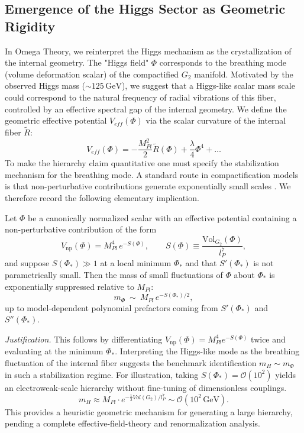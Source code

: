 \subsection{Emergence of the Higgs Sector as Geometric Rigidity}
In Omega Theory, we reinterpret the Higgs mechanism as the crystallization of the internal geometry. The "Higgs field" $\Phi$ corresponds to the breathing mode (volume deformation scalar) of the compactified $G_2$ manifold.
Motivated by the observed Higgs mass ($\sim 125\,\mathrm{GeV}$), we suggest that a Higgs-like scalar mass scale could correspond to the natural frequency of radial vibrations of this fiber, controlled by an effective spectral gap of the internal geometry.
We define the geometric effective potential $V_{eff}(\Phi)$ via the scalar curvature of the internal fiber $\tilde{R}$:
\begin{equation}
    V_{eff}(\Phi) = - \frac{M_{Pl}^2}{2} \tilde{R}(\Phi) + \frac{\lambda}{4} \Phi^4 + \dots
\end{equation}
\noindent
To make the hierarchy claim quantitative one must specify the stabilization mechanism for the breathing mode. A standard route in compactification models is that non-perturbative contributions generate exponentially small scales \cite{KKLT2003}. We therefore record the following elementary implication.
\begin{proposition}
\label{prop:higgs_hierarchy}
Let $\Phi$ be a canonically normalized scalar with an effective potential containing a non-perturbative contribution of the form
\begin{equation}
    V_{\mathrm{np}}(\Phi)=M_{Pl}^4\,e^{-S(\Phi)},\qquad S(\Phi)\equiv \frac{\mathrm{Vol}_{G_2}(\Phi)}{l_P^7},
\end{equation}
and suppose $S(\Phi_\ast)\gg 1$ at a local minimum $\Phi_\ast$ and that $S'(\Phi_\ast)$ is not parametrically small. Then the mass of small fluctuations of $\Phi$ about $\Phi_\ast$ is exponentially suppressed relative to $M_{Pl}$:
\begin{equation}
    m_\Phi\ \sim\ M_{Pl}\,e^{-S(\Phi_\ast)/2},
\end{equation}
up to model-dependent polynomial prefactors coming from $S'(\Phi_\ast)$ and $S''(\Phi_\ast)$.
\end{proposition}
\noindent\textit{Justification.} This follows by differentiating $V_{\mathrm{np}}(\Phi)=M_{Pl}^4 e^{-S(\Phi)}$ twice and evaluating at the minimum $\Phi_\ast$.
\noindent
Interpreting the Higgs-like mode as the breathing fluctuation of the internal fiber suggests the benchmark identification $m_H\sim m_\Phi$ in such a stabilization regime. For illustration, taking $S(\Phi_\ast)=\mathcal{O}(10^2)$ yields an electroweak-scale hierarchy without fine-tuning of dimensionless couplings.
\begin{equation}
    m_H \approx M_{Pl} \cdot e^{-\frac{1}{2} Vol(G_2)/l_P^7} \sim \mathcal{O}(10^2\,\mathrm{GeV}).
\end{equation}
This provides a heuristic geometric mechanism for generating a large hierarchy, pending a complete effective-field-theory and renormalization analysis.

